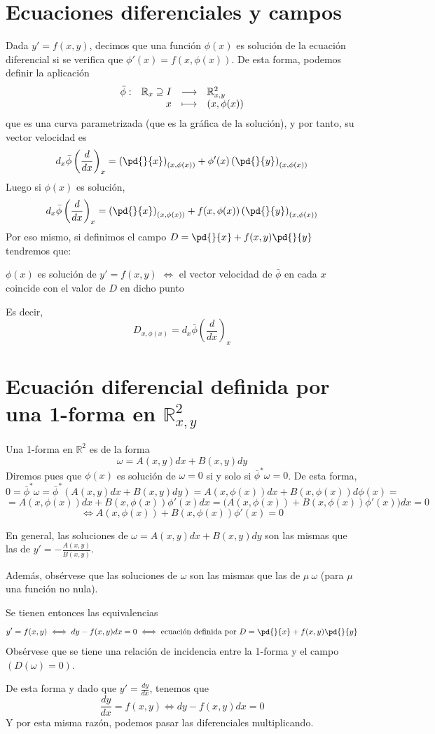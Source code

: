 \section{Ecuaciones diferenciales y campos}
Dada $y'=f(x,y)$, decimos que una función $\phi(x)$ es solución de la ecuación diferencial si se verifica que $\phi'(x)=f(x,\phi(x))$. De esta forma, podemos definir la aplicación
$$\begin{array}{rrcl}
     \Bar{\phi}: & \mathbb R_x \supseteq I & \longrightarrow & \mathbb R_{x,y}^2  \\
     & x & \longmapsto & (x,\phi(x))
\end{array}$$
que es una curva parametrizada (que es la gráfica de la solución), y por tanto, su vector velocidad es 
$$d_x\bar{\phi}\left(\dfrac{d}{dx}\right)_x=\left(\pd{}{x}\right)_{(x,\phi(x))}+\phi'(x)\left(\pd{}{y}\right)_{(x,\phi(x))}$$
Luego si $\phi(x)$ es solución,
$$d_x\bar{\phi}\left(\dfrac{d}{dx}\right)_x=\left(\pd{}{x}\right)_{(x,\phi(x))}+f(x,\phi(x))\left(\pd{}{y}\right)_{(x,\phi(x))}$$
Por eso mismo, si definimos el campo $D=\pd{}{x}+f(x,y)\pd{}{y}$ tendremos que:
\begin{center}
    $\phi(x)$ es solución de $y'=f(x,y)$ $\iff$ el vector velocidad de $\bar{\phi}$ en cada $x$ coincide con el valor de $D$ en dicho punto
\end{center}
Es decir, $$D_{x,\phi(x)}=d_x\bar{\phi}\left(\dfrac{d}{dx}\right)_x$$


\section{Ecuación diferencial definida por una 1-forma en $\mathbb{R}_{x,y}^2$} \label{0.6}
\begin{defi}Una 1-forma en $\mathbb R^2$ es de la forma 
$$\omega=A(x,y)dx+B(x,y)dy$$
Diremos pues que $\phi(x)$ es solución de $\omega=0$ si y solo si $\bar{\phi}^*\omega=0$. De esta forma,
$$0=\bar{\phi}^* \omega=\bar{\phi}^*(A(x,y)dx+B(x,y)dy)=A(x,\phi(x))dx+B(x,\phi(x))d\phi(x)=$$
$$=A(x,\phi(x))dx+B(x,\phi(x))\phi'(x)dx=\Big(A(x,\phi(x))+B(x,\phi(x))\phi'(x)\Big)dx=0$$
$$\iff A(x,\phi(x))+B(x,\phi(x))\phi'(x)=0$$
\end{defi}
\begin{cor}
    En general, las soluciones de  $\omega=A(x,y)dx+B(x,y)dy$ son las mismas que las de $y'=-\frac{A(x,y)}{B(x,y)}$.

    Además, obsérvese que las soluciones de $\omega$ son las mismas que las de $\mu \: \omega$ (para $\mu$ una función no nula).
\end{cor}
\begin{prop}
    Se tienen entonces las equivalencias
    $$y'=f(x,y) \iff dy-f(x,y)dx=0 \iff \text{ecuación definida por }D=\pd{}{x}+f(x,y)\pd{}{y}$$
    Obsérvese que se tiene una relación de incidencia entre la 1-forma y el campo $(D(\omega)=0)$.
\end{prop}
\begin{teo}
    De esta forma y dado que $y'=\frac{dy}{dx}$, tenemos que 
    $$\dfrac{dy}{dx}=f(x,y) \iff dy-f(x,y)dx=0$$
    Y por esta misma razón, podemos pasar las diferenciales multiplicando.
\end{teo}

